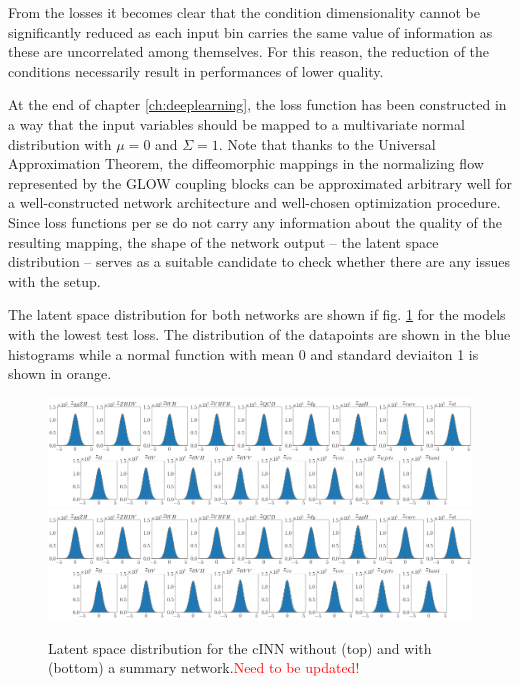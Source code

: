 From the losses it becomes clear that the condition dimensionality cannot be significantly reduced as each input bin carries the same value of information as these are uncorrelated among themselves. For this reason, the reduction of the conditions necessarily result in performances of lower quality.

\Subsection{\textcolor{red}{Latent Space Distribution}}

At the end of chapter \ref{ch:deeplearning}, the loss function has been constructed in a way that the input variables should be mapped to a multivariate normal distribution with $\mu = 0$ and $\Sigma=1$. Note that thanks to the Universal Approximation Theorem, the diffeomorphic mappings in the normalizing flow represented by the GLOW coupling blocks can be approximated arbitrary well for a well-constructed network architecture and well-chosen optimization procedure. Since loss functions per se do not carry any information about the quality of the resulting mapping, the shape of the network output -- the latent space distribution -- serves as a suitable candidate to check whether there are any issues with the setup.

The latent space distribution for both networks are shown if fig. \ref{fig:latents} for the models with the lowest test loss. The distribution of the datapoints are shown in the blue histograms while a normal function with mean 0 and standard deviaiton 1 is shown in orange.

\begin{figure}[h!]
	\centering
	\includegraphics[width=\textwidth]{figures/inference/ls.png}
	\includegraphics[width=\textwidth]{figures/inference/ls_SN.png}
	\caption{Latent space distribution for the cINN without (top) and with (bottom) a summary network.\textcolor{red}{Need to be updated!}}
	\label{fig:latents}
\end{figure}

